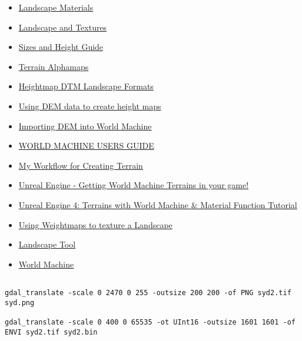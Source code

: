 \documentclass[]{article}
\begin{document}
\begin{itemize}
\itemsep1pt\parskip0pt
\item
  \href{https://docs.unrealengine.com/latest/INT/Engine/Landscape/Materials/index.html\#landscape-specificmaterialnodes}{Landscape
  Materials}
\item
  \href{https://forums.epicgames.com/threads/915737-Landscape-and-Textures}{Landscape
  and Textures}
\item
  \href{https://wiki.unrealengine.com/Landscape_-_Sizes_and_Height_Guide}{Sizes
  and Height Guide}
\item
  \href{http://udn.epicgames.com/Three/TerrainAlphamaps.html}{Terrain
  Alphamaps}
\item
  \href{https://forums.unrealengine.com/showthread.php?3884-Heightmap-DTM-Landscape-Formats}{Heightmap
  DTM Landscape Formats}
\item
  \href{http://scrawkblog.com/2013/02/05/using-dem-data-to-create-height-maps/}{Using
  DEM data to create height maps}
\item
  \href{http://forum.world-machine.com/index.php?topic=1299.0}{Importing
  DEM into World Machine}
\item
  \href{http://www.world-machine.com/World\%20Machine\%20Help.pdf}{WORLD
  MACHINE USERS GUIDE}
\item
  \href{https://forums.unrealengine.com/showthread.php?1265-Tutorial-My-Workflow-for-Creating-Terrain}{My
  Workflow for Creating Terrain}
\item
  \href{https://www.youtube.com/watch?v=K9WTKK9f1b8}{Unreal Engine -
  Getting World Machine Terrains in your game!}
\item
  \href{https://www.youtube.com/watch?v=4SQPzgzAsfI}{Unreal Engine 4:
  Terrains with World Machine \& Material Function Tutorial}
\item
  \href{https://wiki.unrealengine.com/Using_Weightmaps_to_texture_a_Landscape}{Using
  Weightmaps to texture a Landscape}
\item
  \href{https://wiki.unrealengine.com/Landscape_Tool_-_Video}{Landscape
  Tool}
\item
  \href{http://www.world-machine.com/about.php?page=features}{World
  Machine}
\end{itemize}

\begin{verbatim}

gdal_translate -scale 0 2470 0 255 -outsize 200 200 -of PNG syd2.tif syd.png

gdal_translate -scale 0 400 0 65535 -ot UInt16 -outsize 1601 1601 -of ENVI syd2.tif syd2.bin
\end{verbatim}
\end{document}
